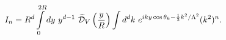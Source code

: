 \begin{equation}
 \label{eyeen1}
I_n=R^d\int\limits_0^{2R} dy~ y^{d-1}~\widetilde{\cal
D}_V\left(\frac{y}{R}\right) \int d^dk ~ e^{ i k y
\cos\theta_k-\frac{1}{2} k^2/\Lambda^2}
(k^2)^n.
\end{equation}

